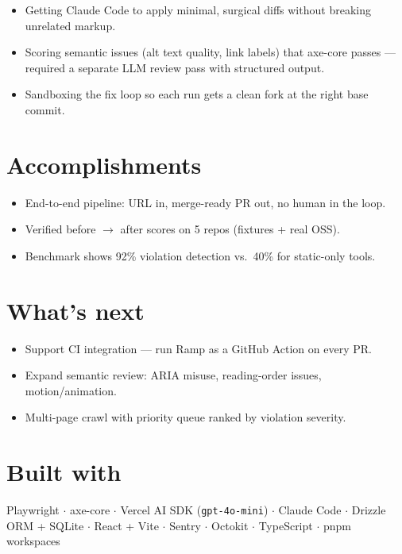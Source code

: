 \documentclass[11pt, a4paper]{article}
\begin{document}
\begin{itemize}
  \item Getting Claude Code to apply minimal, surgical diffs without breaking unrelated markup.
  \item Scoring semantic issues (alt text quality, link labels) that axe-core passes — required
        a separate LLM review pass with structured output.
  \item Sandboxing the fix loop so each run gets a clean fork at the right base commit.
\end{itemize}

\section{Accomplishments}

\begin{itemize}
  \item End-to-end pipeline: URL in, merge-ready PR out, no human in the loop.
  \item Verified before $\rightarrow$ after scores on 5 repos (fixtures + real OSS).
  \item Benchmark shows 92\% violation detection vs.\ 40\% for static-only tools.
\end{itemize}

\section{What's next}

\begin{itemize}
  \item Support CI integration — run Ramp as a GitHub Action on every PR.
  \item Expand semantic review: ARIA misuse, reading-order issues, motion/animation.
  \item Multi-page crawl with priority queue ranked by violation severity.
\end{itemize}

\section{Built with}

Playwright $\cdot$ axe-core $\cdot$ Vercel AI SDK (\texttt{gpt-4o-mini}) $\cdot$ Claude Code $\cdot$
Drizzle ORM + SQLite $\cdot$ React + Vite $\cdot$ Sentry $\cdot$ Octokit $\cdot$
TypeScript $\cdot$ pnpm workspaces
\end{document}
